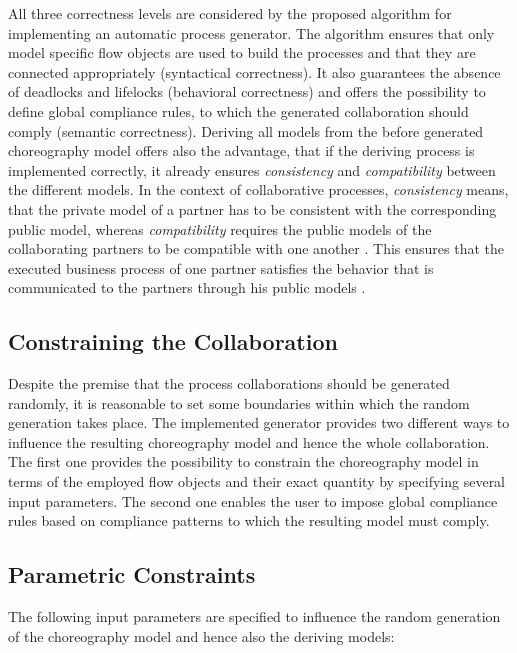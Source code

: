 \documentclass[runningheads]{llncs}
\begin{document}
All three correctness levels are considered by the proposed algorithm for implementing an automatic process generator. The algorithm ensures that only model specific flow objects are used to build the processes and that they are connected appropriately (syntactical correctness). It also guarantees the absence of deadlocks and lifelocks (behavioral correctness) and offers the possibility to define global compliance rules, to which the generated collaboration should comply (semantic correctness). Deriving all models from the before generated choreography model offers also the advantage, that if the deriving process is implemented correctly, it already ensures \textit{consistency} and \textit{compatibility} between the different models. In the context of collaborative processes, \textit{consistency} means, that the private model of a partner has to be consistent with the corresponding public model, whereas \textit{compatibility} requires the public models of the collaborating partners to be compatible with one another \cite{FDHILA20151}. This ensures that the executed business process of one partner satisfies the behavior that is communicated to the partners through his public models \cite{sabrina1174}.

\subsection{Constraining the Collaboration}

Despite the premise that the process collaborations should be generated randomly, it is reasonable to set some boundaries within which the random generation takes place. The implemented generator provides two different ways to influence the resulting choreography model and hence the whole collaboration. The first one provides the possibility to constrain the choreography model in terms of the employed flow objects and their exact quantity by specifying several input parameters. The second one enables the user to impose global compliance rules based on compliance patterns to which the resulting model must comply.

\subsection{Parametric Constraints} \label{sec:param_constraints}

The following input parameters are specified to influence the random generation of the choreography model and hence also the deriving models:
\end{document}
